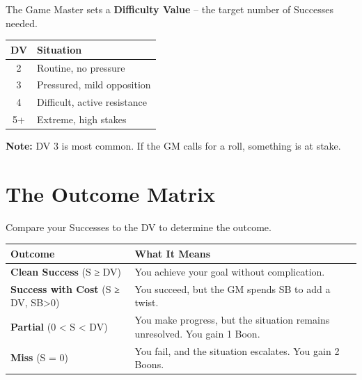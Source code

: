 The Game Master sets a \textbf{Difficulty Value} – the target number of Successes needed.

\begin{tcolorbox}[colback=gray!5!white,colframe=gray!70!black,title=Difficulty Value (DV) Ladder]
\begin{center}
\begin{tabular}{cl}
\toprule
\textbf{DV} & \textbf{Situation} \\
\midrule
2 & Routine, no pressure \\
3 & Pressured, mild opposition \\
4 & Difficult, active resistance \\
5+ & Extreme, high stakes \\
\bottomrule
\end{tabular}
\end{center}
\end{tcolorbox}

\noindent \textbf{Note:} DV 3 is most common. If the GM calls for a roll, something is at stake.

\section{The Outcome Matrix}
\label{sec:outcome-matrix}

Compare your Successes to the DV to determine the outcome.

\begin{tcolorbox}[colback=gray!5!white,colframe=gray!70!black,title=Outcome Matrix]
\begin{center}
\begin{tabular}{ll}
\toprule
\textbf{Outcome} & \textbf{What It Means} \\
\midrule
\textbf{Clean Success} (S ≥ DV) & You achieve your goal without complication. \\
\textbf{Success with Cost} (S ≥ DV, SB>0) & You succeed, but the GM spends SB to add a twist. \\
\textbf{Partial} (0 < S < DV) & You make progress, but the situation remains unresolved. You gain 1 Boon. \\
\textbf{Miss} (S = 0) & You fail, and the situation escalates. You gain 2 Boons. \\
\bottomrule
\end{tabular}
\end{center}
\end{tcolorbox}

